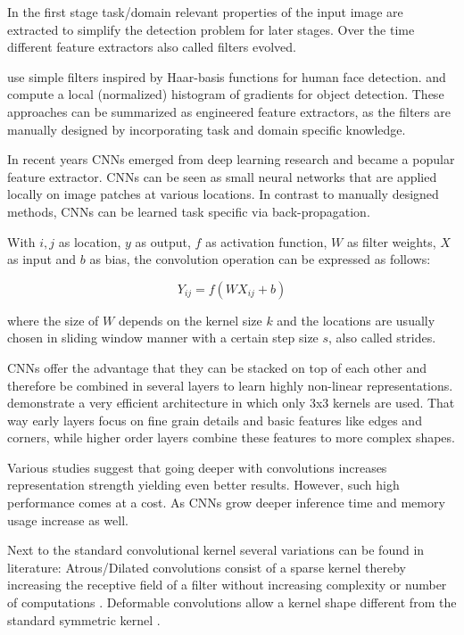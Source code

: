 	In the first stage task/domain relevant properties of the input image are extracted to simplify the detection problem for later stages. Over the time different feature extractors also called filters evolved.
	
	\cite{Viola2004} use simple filters inspired by Haar-basis functions for human face detection. \cite{Dalal} and \cite{Lowe2004} compute a local (normalized) histogram of gradients for object detection. These approaches can be summarized as engineered feature extractors, as the filters are manually designed by incorporating task and domain specific knowledge. 
	
	In recent years \acp{CNN} emerged from deep learning research and became a popular feature extractor. \acp{CNN} can be seen as small neural networks that are applied locally on image patches at various locations. In contrast to manually designed methods, \acp{CNN} can be learned task specific via back-propagation.
	
	With $i,j$ as location, $y$ as output, $f$ as activation function, $W$ as filter weights, $X$ as input and $b$ as bias, the convolution operation can be expressed as follows:
	
	$$Y_{ij} = f(WX_{ij} + b)$$
	
	where the size of $W$ depends on the kernel size $k$ and the locations are usually chosen in sliding window manner with a certain step size $s$, also called strides.
	
	\acp{CNN} offer the advantage that they can be stacked on top of each other and therefore be combined in several layers to learn highly non-linear representations.
	 demonstrate a very efficient architecture in which only 3x3 kernels are used. That way early layers focus on fine grain details and basic features like edges and corners, while higher order layers combine these features to more complex shapes. 
	
	Various studies suggest that going deeper with convolutions increases representation strength yielding even better results. However, such high performance comes at a cost. As \acp{CNN} grow deeper inference time and memory usage increase as well.
	
	Next to the standard convolutional kernel several variations can be found in literature: Atrous/Dilated convolutions consist of a sparse kernel thereby increasing the receptive field of a filter without increasing complexity or number of computations . Deformable convolutions allow a kernel shape different from the standard symmetric kernel .
	
